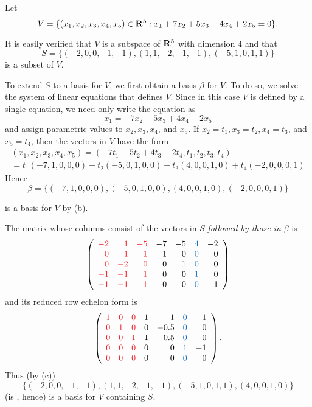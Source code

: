 \begin{example} \label{example 3.4.4}
Let
\[
    V = \{
        (x_1, x_2, x_3, x_4, x_5) \in \mathbf{R}^5
        : x_1 + 7x_2 + 5x_3 - 4x_4 + 2x_5 = 0
    \}.
\]

It is easily verified that \(V\) is a subspace of \(\mathbf{R}^{5}\) with dimension \(4\) and that
\[
    S = \{(-2,0,0,-1,-1),(1,1,-2,-1,-1),(-5,1,0,1,1)\}
\]
is a \LID{} subset of \(V\).

To extend \(S\) to a basis for \(V\), we first obtain a basis  \(\beta\) for \(V\).
To do so, we solve the system of linear equations that defines \(V\).
Since in this case \(V\) is defined by a single equation, we need only write the equation as
\[
    x_1 = -7 x_2 - 5 x_3 + 4 x_4 - 2 x_5
\]
and assign parametric values to \(x_2, x_3, x_4\), and \(x_5\).
If \(x_2 = t_1, x_3 = t_2, x_4 = t_3\), and \(x_5 = t_4\), then the vectors in \(V\) have the form
\[
\begin{array}{l}
    (x_1, x_2, x_3, x_4, x_5) = (-7 t_1 - 5 t_2 + 4 t_3 - 2 t_4, t_1, t_2, t_3, t_4) \\
    = t_1(-7,1,0,0,0) + t_2(-5,0,1,0,0) + t_3(4,0,0,1,0) + t_4(-2,0,0,0,1)
\end{array}
\]
Hence
\[
    \beta = \{(-7,1,0,0,0),(-5,0,1,0,0),(4,0,0,1,0),(-2,0,0,0,1)\}
\]

is a basis for \(V\) by (b).

The matrix whose columns consist of the vectors in \(S\) \emph{followed by those in} \(\beta\) is
\[
    \left(\begin{array}{rrrrrrr}
        \RED{-2} & \RED{1}  & \RED{-5} & -7 & -5 & \BLUE{4} & -2 \\
        \RED{0}  & \RED{1}  & \RED{1}  &  1 &  0 & \BLUE{0} & 0 \\
        \RED{0}  & \RED{-2} & \RED{0}  &  0 &  1 & \BLUE{0} & 0 \\
        \RED{-1} & \RED{-1} & \RED{1}  &  0 &  0 & \BLUE{1} & 0 \\
        \RED{-1} & \RED{-1} & \RED{1}  &  0 &  0 & \BLUE{0} & 1
    \end{array}\right)
\]
and its reduced row echelon form is
\[
    \left(\begin{array}{llllrlr}
        \RED{1} & \RED{0} & \RED{0} & 1 &    1 & \BLUE{0} & -1 \\
        \RED{0} & \RED{1} & \RED{0} & 0 & -0.5 & \BLUE{0} & 0 \\
        \RED{0} & \RED{0} & \RED{1} & 1 &  0.5 & \BLUE{0} & 0 \\
        \RED{0} & \RED{0} & \RED{0} & 0 &    0 & \BLUE{1} & -1 \\
        \RED{0} & \RED{0} & \RED{0} & 0 &    0 & \BLUE{0} & 0
\end{array}\right).
\]
Thus (by (c))
\[
    \{(-2,0,0,-1,-1),(1,1,-2,-1,-1),(-5,1,0,1,1),(4,0,0,1,0)\}
\]
(is \LID{}, hence) is a basis for \(V\) containing \(S\).
\end{example}
